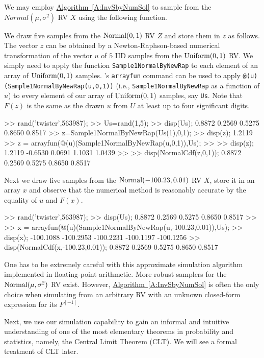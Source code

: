 \begin{simulation}\label{SIM:NormalByNewRap}
We may employ \hyperref[A:InvSbyNumSol]{Algorithm~\ref*{A:InvSbyNumSol}} to sample from the $Normal(\mu,\sigma^2)$ RV $X$ using the following function.

We draw five samples from the $\mbox{{\rm Normal}}(0,1)$ RV $Z$ and store them in $z$ as follows.  The vector $z$ can be obtained by a Newton-Raphson-based numerical transformation of the vector $u$ of $5$ IID samples from the $\mbox{{\rm Uniform}}(0,1)$ RV.  We simply need to apply the function {\tt Sample1NormalByNewRap} to each element of an array of $\mbox{{\rm Uniform}}(0,1)$ samples.  \Matlab's {\tt arrayfun} command can be used to apply {\tt @(u)(Sample1NormalByNewRap(u,0,1))} (i.e., {\tt Sample1NormalByNewRap} as a function of $u$) to every element of our array of $\mbox{{\rm Uniform}}(0,1)$ samples, say {\tt Us}.  Note that $F(z)$ is the same as the drawn $u$ from $U$ at least up to four significant digits.
\begin{VrbM}
>> rand('twister',563987);
>> Us=rand(1,5); %
>> disp(Us); %
    0.8872    0.2569    0.5275    0.8650    0.8517
>> z=Sample1NormalByNewRap(Us(1),0,1); %
>> disp(z); %
    1.2119
>> z = arrayfun(@(u)(Sample1NormalByNewRap(u,0,1)),Us); %
>> %
>> disp(z);
    1.2119   -0.6530    0.0691    1.1031    1.0439
>> %
>> disp(NormalCdf(z,0,1));
    0.8872    0.2569    0.5275    0.8650    0.8517
\end{VrbM}
Next we draw five samples from the $\mbox{{\rm Normal}}(-100.23,0.01)$ RV $X$, store it in an array $x$ and observe that the numerical method is reasonably accurate by the equality of $u$ and $F(x)$.
\begin{VrbM}
>> rand('twister',563987);
>> disp(Us); %
    0.8872    0.2569    0.5275    0.8650    0.8517
>> %
>> x = arrayfun(@(u)(Sample1NormalByNewRap(u,-100.23,0.01)),Us);
>> disp(x);
 -100.1088 -100.2953 -100.2231 -100.1197 -100.1256
>> disp(NormalCdf(x,-100.23,0.01));
    0.8872    0.2569    0.5275    0.8650    0.8517
\end{VrbM}
One has to be extremely careful with this approximate simulation algorithm implemented in floating-point arithmetic.  More robust samplers for the $\mbox{{\rm Normal}}(\mu,\sigma^2)$ RV exist.
However, \hyperref[A:InvSbyNumSol]{Algorithm~\ref*{A:InvSbyNumSol}} is often the only choice when simulating from an arbitrary RV with an unknown closed-form expression for its $F^{[-1]}$.
\end{simulation}
Next, we use our simulation capability to gain an informal and intuitive understanding of one of the most elementary theorems in probability and statistics, namely, the Central Limit Theorem (CLT).  We will see a formal treatment of CLT later.

